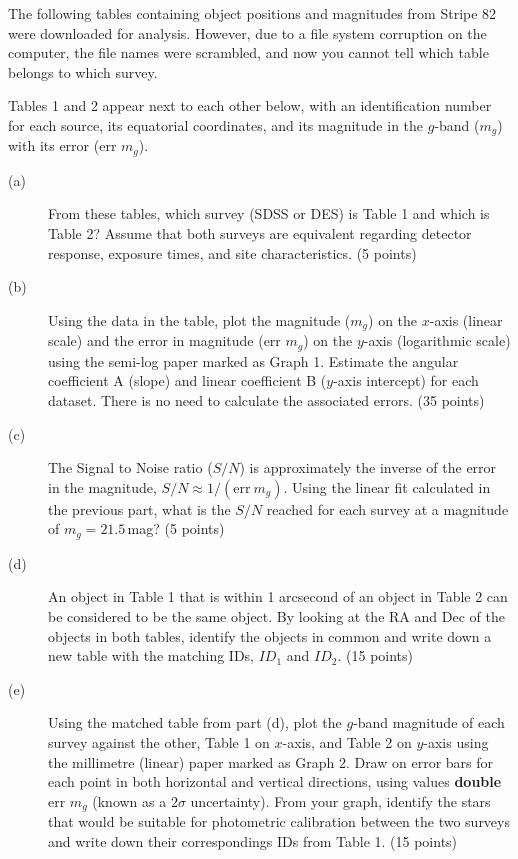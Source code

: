 The following tables containing object positions and magnitudes from Stripe
82 were downloaded for analysis. However, due to a file system corruption on
the computer, the file names were scrambled, and now you cannot tell which
table belongs to which survey.

Tables 1 and 2 appear next to each other below, with an identification
number for each source, its equatorial coordinates, and its magnitude in the
$g$-band ($m_g$) with its error (err $m_g$).

\begin{description}
\item[(a)] From these tables, which survey (SDSS or DES) is Table 1 and
  which is Table 2? Assume that both surveys are equivalent regarding
  detector response, exposure times, and site characteristics.
  \hfill(5 points)
\item[(b)] Using the data in the table, plot the magnitude ($m_g$) on the
  $x$-axis (linear scale) and the error in magnitude (err $m_g$) on the
  $y$-axis (logarithmic scale) using the semi-log paper marked as Graph 1.
  Estimate the angular coefficient A (slope) and linear coefficient B
  ($y$-axis intercept) for each dataset. There is no need to calculate the
  associated errors. \hfill(35 points)
\item[(c)] The Signal to Noise ratio ($S/N$) is approximately the inverse of
  the error in the magnitude, $S/N \approx 1/(\mathrm{err}\ m_g)$. Using the
  linear fit calculated in the previous part, what is the $S/N$ reached for
  each survey at a magnitude of $m_g = 21.5$\,mag? \hfill(5 points)
\item[(d)] An object in Table 1 that is within 1 arcsecond of an object in
  Table 2 can be considered to be the same object. By looking at the RA and
  Dec of the objects in both tables, identify the objects in common and
  write down a new table with the matching IDs, $ID_1$ and $ID_2$.
  \hfill(15 points)
\item[(e)] Using the matched table from part (d), plot the $g$-band
  magnitude of each survey against the other, Table 1 on $x$-axis, and
  Table 2 on $y$-axis using the millimetre (linear) paper marked as Graph 2.
  Draw on error bars for each point in both horizontal and vertical
  directions, using values \textbf{double} err $m_g$ (known as a $2\sigma$
  uncertainty). From your graph, identify the stars that would be suitable
  for photometric calibration between the two surveys and write down their
  correspondings IDs from Table 1. \hfill(15 points)
\end{description}

